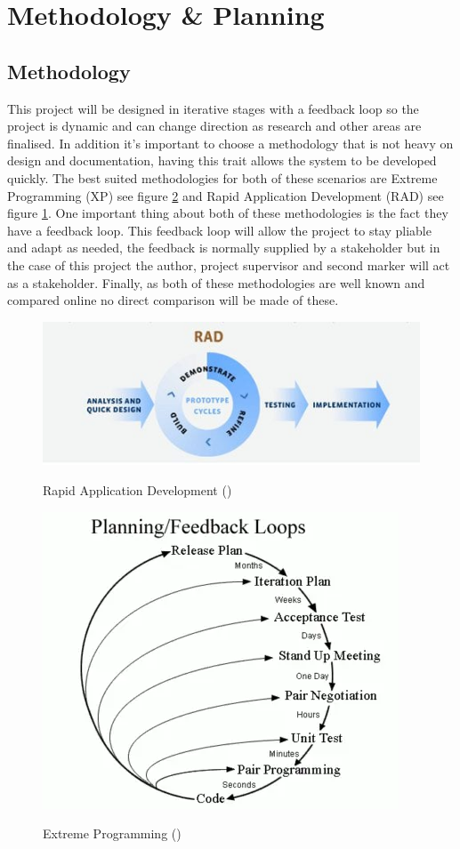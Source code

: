 \section{Methodology \& Planning}
\subsection{Methodology}
This project will be designed in iterative stages with a feedback loop so the project is dynamic and can change direction as research and other areas are finalised. In addition it's important to choose a methodology that is not heavy on design and documentation, having this trait allows the system to be developed quickly. The best suited methodologies for both of these scenarios are Extreme Programming (XP) see figure \ref{fig:xp} and Rapid Application Development (RAD) see figure \ref{fig:rad}. One important thing about both of these methodologies is the fact they have a feedback loop. This feedback loop will allow the project to stay pliable and adapt as needed, the feedback is normally supplied by a stakeholder but in the case of this project the author, project supervisor and second marker will act as a stakeholder. Finally, as both of these methodologies are well known and compared online no direct comparison will be made of these.

\begin{figure}[h]
	\includegraphics[width=\linewidth]{./images/methodology/RAD.png}\\
	\caption{Rapid Application Development (\cite{ankitasingh_2019_what})}
	\label{fig:rad}
\end{figure}
\begin{figure}[h]
	\includegraphics[width=0.5\linewidth]{./images/methodology/XP.png}\\
	\caption{Extreme Programming (\cite{ponomareff_learning})}
	\label{fig:xp}
\end{figure}


